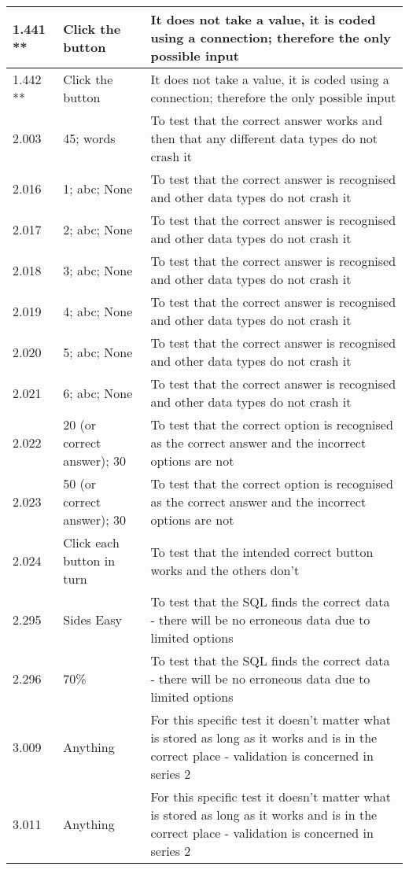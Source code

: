 \begin{landscape}
\begin{center}
\begin{longtable}{|p{4cm}|p{4cm}|p{5cm}|}
1.441 ** & Click the button & It does not take a value, it is coded using a connection; therefore the only possible input \\ \hline
1.442 ** & Click the button & It does not take a value, it is coded using a connection; therefore the only possible input \\ \hline
2.003 & 45; words & To test that the correct answer works and then that any different data types do not crash it \\ \hline
2.016 & 1; abc; None & To test that the correct answer is recognised and other data types do not crash it \\ \hline
2.017 & 2; abc; None & To test that the correct answer is recognised and other data types do not crash it \\ \hline 
2.018 & 3; abc; None & To test that the correct answer is recognised and other data types do not crash it \\ \hline
2.019 & 4; abc; None & To test that the correct answer is recognised and other data types do not crash it \\ \hline
2.020 & 5; abc; None & To test that the correct answer is recognised and other data types do not crash it \\ \hline
2.021 & 6; abc; None & To test that the correct answer is recognised and other data types do not crash it \\ \hline
2.022 & 20 (or correct answer); 30 & To test that the correct option is recognised as the correct answer and the incorrect options are not \\ \hline
2.023 & 50 (or correct answer); 30 & To test that the correct option is recognised as the correct answer and the incorrect options are not \\ \hline
2.024 & Click each button in turn & To test that the intended correct button works and the others don't \\ \hline
2.295 & Sides Easy & To test that the SQL finds the correct data - there will be no erroneous data due to limited options \\ \hline
2.296 & 70\% & To test that the SQL finds the correct data - there will be no erroneous data due to limited options \\ \hline
3.009 & Anything & For this specific test it doesn't matter what is stored as long as it works and is in the correct place - validation is concerned in series 2 \\ \hline
3.011 & Anything & For this specific test it doesn't matter what is stored as long as it works and is in the correct place - validation is concerned in series 2 \\ \hline

\end{longtable}
\end{center}
\end{landscape}
